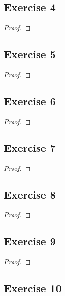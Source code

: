 \documentclass[14pt]{extarticle}
\begin{document}
\subsection{Exercise 4}

\begin{proof}

\end{proof}

\subsection{Exercise 5}

\begin{proof}

\end{proof}

\subsection{Exercise 6}

\begin{proof}

\end{proof}

\subsection{Exercise 7}

\begin{proof}

\end{proof}

\subsection{Exercise 8}

\begin{proof}

\end{proof}

\subsection{Exercise 9}

\begin{proof}

\end{proof}

\subsection{Exercise 10}
\end{document}
